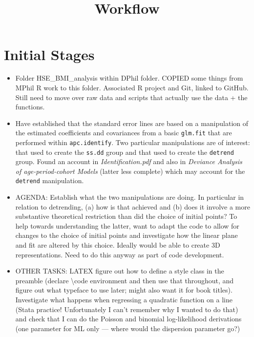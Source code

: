 \documentclass[]{article}
\title{Workflow}
\begin{document}
\maketitle
\section{Initial Stages}
\begin{itemize}
\item Folder HSE\_BMI\_analysis within DPhil folder. COPIED some things from MPhil R work to this folder. Associated R project and Git, linked to GitHub. Still need to move over raw data and scripts that actually use the data + the functions.
\item Have established that the standard error lines are based on a manipulation of the estimated coefficients and covariances from a basic \texttt{glm.fit} that are performed within \texttt{apc.identify}. Two particular manipulations are of interest: that used to create the \texttt{ss.dd} group and that used to create the \texttt{detrend} group. Found an account in \textit{Identification.pdf} and also in \textit{Deviance Analysis of age-period-cohort Models} (latter less complete) which may account for the \texttt{detrend} manipulation.
\item AGENDA: Establish what the two manipulations are doing. In particular in relation to detrending, (a) how is that achieved and (b) does it involve a more substantive theoretical restriction than did the choice of initial points? To help towards understanding the latter, want to adapt the code to allow for changes to the choice of initial points and investigate how the linear plane and fit are altered by this choice. Ideally would be able to create 3D representations. Need to do this anyway as part of code development.
\item OTHER TASKS: LATEX figure out how to define a style class in the preamble (declare \textbackslash code environment and then use that throughout, and figure out what typeface to use later; might also want it for book titles). Investigate what happens when regressing a quadratic function on a line (Stata practice! Unfortunately I can't remember why I wanted to do that) and check that I can do the Poisson and binomial log-likelihood derivations (one parameter for ML only --- where would the dispersion parameter go?)
\end{itemize}
\end{document}
